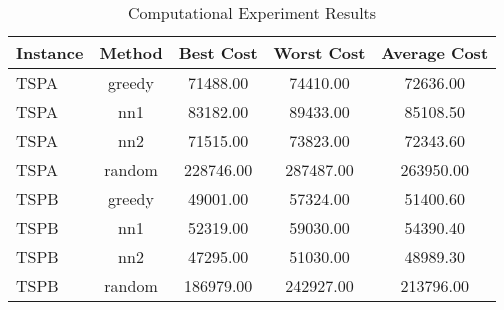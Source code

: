 \begin{table}[ht]
\centering
\caption{Computational Experiment Results}
\label{tab:results}
\begin{tabular}{lcccc}
\hline
Instance & Method & Best Cost & Worst Cost & Average Cost \\
\hline
TSPA & greedy & 71488.00 & 74410.00 & 72636.00 \\
TSPA & nn1 & 83182.00 & 89433.00 & 85108.50 \\
TSPA & nn2 & 71515.00 & 73823.00 & 72343.60 \\
TSPA & random & 228746.00 & 287487.00 & 263950.00 \\
TSPB & greedy & 49001.00 & 57324.00 & 51400.60 \\
TSPB & nn1 & 52319.00 & 59030.00 & 54390.40 \\
TSPB & nn2 & 47295.00 & 51030.00 & 48989.30 \\
TSPB & random & 186979.00 & 242927.00 & 213796.00 \\
\hline
\end{tabular}
\end{table}
